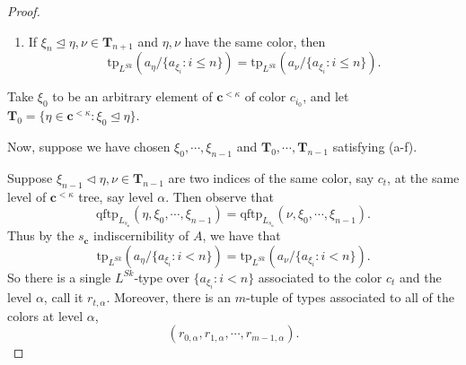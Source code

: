 \documentclass[10pt,a4paper]{amsart}
\newcommand{\dom}{\text{dom }}
\newcommand{\qftp}{\text{qftp}}
\newcommand{\tp}{\text{tp}}
\begin{document}
\begin{proof}
\begin{enumerate}[label=(\alph*)]
    
        \item If $\xi_{n}\trianglelefteq\eta,\nu\in\textbf{T}_{n+1}$  and $\eta,\nu$ have the same color, then  $$\tp_{L^{Sk}}(a_\eta/\{a_{\xi_i}\colon i\leq n\})=\tp_{L^{Sk}}(a_\nu/\{a_{\xi_i}\colon i\leq n\}).$$
    \end{enumerate}

    Take $\xi_0$ to be an arbitrary element of $\textbf{c}^{<\kappa}$ of color $c_{i_0}$, and let $\textbf{T}_0=\{\eta\in\textbf{c}^{<\kappa}\colon \xi_0\trianglelefteq\eta\}$.
    

    Now, suppose we have chosen $\xi_0,\dotsm, \xi_{n-1}$ and $\textbf{T}_0,\dotsm, \textbf{T}_{n-1}$ satisfying (a-f). %

    Suppose $\xi_{n-1}\triangleleft\eta,\nu\in\textbf{T}_{n-1}$ are two indices of the same color, say $c_t$, at the same level of $\textbf{c}^{<\kappa}$ tree, say level $\alpha$. Then observe that $$\qftp_{L_{s_\textbf{c}}}(\eta,\xi_0,\dotsm, \xi_{n-1})=\qftp_{L_{s_\textbf{c}}}(\nu,\xi_0,\dotsm, \xi_{n-1}).$$
    Thus by the $s_\textbf{c}$ indiscernibility of $A$, we have that 
    $$\tp_{L^{Sk}}(a_\eta/\{a_{\xi_i}\colon i<n\})=\tp_{L^{Sk}}(a_\nu/\{a_{\xi_i}\colon i<n\}).$$
    So there is a single ${L^{Sk}}$-type over $\{a_{\xi_i}\colon i<n\}$ associated to the color $c_t$ and the level $\alpha$, call it $r_{t,\alpha}$. Moreover, there is an $m$-tuple of types associated to all of the colors at level $\alpha$, $$(r_{0,\alpha},r_{1,\alpha},\dotsm, r_{m-1,\alpha}).$$


\end{proof}
\end{document}
